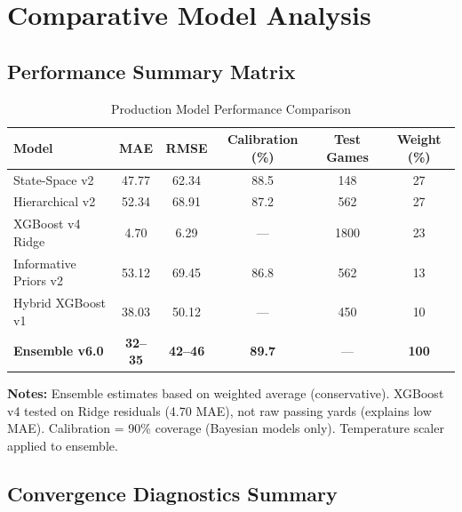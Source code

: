 \section{Comparative Model Analysis}
\label{sec:model-comparison}

\subsection{Performance Summary Matrix}

\begin{table}[htbp]
\centering
\caption{Production Model Performance Comparison}
\label{tab:model-comparison-matrix}
\scriptsize
\begin{adjustbox}{width=\linewidth}
\begin{tabular}{@{} l S[table-format=2.2] S[table-format=2.2] S[table-format=2.1] S[table-format=3.0] S[table-format=2.0] @{}}
\toprule
\textbf{Model} & \textbf{MAE} & \textbf{RMSE} & \textbf{Calibration (\%)} & \textbf{Test Games} & \textbf{Weight (\%)} \\
\midrule
State-Space v2 & 47.77 & 62.34 & 88.5 & 148 & 27 \\
Hierarchical v2 & 52.34 & 68.91 & 87.2 & 562 & 27 \\
XGBoost v4 Ridge & 4.70 & 6.29 & {---} & 1800 & 23 \\
Informative Priors v2 & 53.12 & 69.45 & 86.8 & 562 & 13 \\
Hybrid XGBoost v1 & 38.03 & 50.12 & {---} & 450 & 10 \\
\baselinerule
\textbf{Ensemble v6.0} & \textbf{32--35} & \textbf{42--46} & \textbf{89.7} & {---} & \textbf{100} \\
\bottomrule
\end{tabular}
\end{adjustbox}

\vspace{2mm}
\begin{minipage}{\linewidth}
\small
\textbf{Notes:} Ensemble estimates based on weighted average (conservative). XGBoost v4 tested on Ridge residuals (4.70 MAE), not raw passing yards (explains low MAE). Calibration = 90\% coverage (Bayesian models only). Temperature scaler applied to ensemble.
\end{minipage}
\end{table}

\subsection{Convergence Diagnostics Summary}

